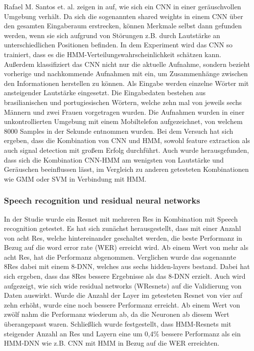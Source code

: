 Rafael M. Santos et. al. zeigen in \cite{noisycnn} auf, wie sich ein CNN in einer geräuschvollen Umgebung verhält. Da sich die sogenannten shared weights in einem CNN über den gesamten Eingaberaum erstrecken, können Merkmale selbst dann gefunden werden, wenn sie sich aufgrund von Störungen z.B. durch Lautstärke an unterschiedlichen Positionen befinden. In dem Experiment wird das CNN so trainiert, dass es die HMM-Verteilungswahrscheinlichkeit schätzen kann. Außerdem klassifiziert das CNN nicht nur die aktuelle Aufnahme, sondern bezieht vorherige und nachkommende Aufnahmen mit ein, um Zusammenhänge zwischen den Informationen herstellen zu können. Als Eingabe werden einzelne Wörter mit ansteigender Lautstärke eingesetzt. Die Eingabedaten bestehen aus brasilianischen und portugiesischen Wörtern, welche zehn mal von jeweils sechs Männern und zwei Frauen vorgetragen wurden. Die Aufnahmen wurden in einer unkontrollierten Umgebung mit einem Mobiltelefon aufgezeichnet, von welchem 8000 Samples in der Sekunde entnommen wurden. Bei dem Versuch hat sich ergeben, dass die Kombination von CNN und HMM, sowohl feature extraction als auch signal detection mit großem Erfolg durchführt. Auch wurde herausgefunden, dass sich die Kombination CNN-HMM am wenigsten von Lautstärke und Geräuschen beeinflussen lässt, im Vergleich zu anderen getesteten Kombinationen wie GMM \cite{svmgmm} oder SVM \cite{svmgmm} in Verbindung mit HMM.

\subsubsection{Speech recognition und residual neural networks}
In der Studie \cite{residualnn} wurde ein Resnet mit mehreren Res in Kombination mit Speech recognition getestet. Es hat sich zunächst herausgestellt, dass mit einer Anzahl von acht Res, welche hintereinander geschaltet werden, die beste Performanz in Bezug auf die word error rate (WER) erreicht wird. Ab einem Wert von mehr als acht Res, hat die Performanz abgenommen. Verglichen wurde das sogenannte 8Res dabei mit einem 8-DNN, welches aus sechs hidden-layers bestand. Dabei hat sich ergeben, dass das 8Res bessere Ergebnisse als das 8-DNN erzielt. Auch wird aufgezeigt, wie sich wide residual networks (WResnets) auf die Validierung von Daten auswirkt. Wurde die Anzahl der Layer im getesteten Resnet von vier auf zehn erhöht, wurde eine noch bessere Performanz erreicht. Ab einem Wert von zwölf nahm die Performanz wiederum ab, da die Neuronen ab diesem Wert überangepasst waren. Schließlich wurde festgestellt, dass HMM-Resnets mit steigender Anzahl an Res und Layern eine um 0,4\% bessere Performanz als ein HMM-DNN \cite{residualnn} wie z.B. CNN mit HMM in Bezug auf die WER erreichten.


